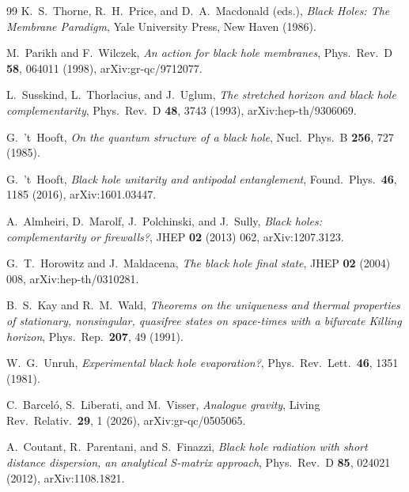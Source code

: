 \documentclass[11pt]{article}
\theoremstyle{definition}
\theoremstyle{remark}
\begin{document}
\begin{thebibliography}{99}
K.~S.~Thorne, R.~H.~Price, and D.~A.~Macdonald (eds.),
\emph{Black Holes: The Membrane Paradigm},
Yale University Press, New Haven (1986).

M.~Parikh and F.~Wilczek,
\emph{An action for black hole membranes},
Phys.\ Rev.\ D \textbf{58}, 064011 (1998), arXiv:gr-qc/9712077.

L.~Susskind, L.~Thorlacius, and J.~Uglum,
\emph{The stretched horizon and black hole complementarity},
Phys.\ Rev.\ D \textbf{48}, 3743 (1993), arXiv:hep-th/9306069.

G.~'t~Hooft,
\emph{On the quantum structure of a black hole},
Nucl.\ Phys.\ B \textbf{256}, 727 (1985).

G.~'t~Hooft,
\emph{Black hole unitarity and antipodal entanglement},
Found.\ Phys.\ \textbf{46}, 1185 (2016), arXiv:1601.03447.

A.~Almheiri, D.~Marolf, J.~Polchinski, and J.~Sully,
\emph{Black holes: complementarity or firewalls?},
JHEP \textbf{02} (2013) 062, arXiv:1207.3123.

G.~T.~Horowitz and J.~Maldacena,
\emph{The black hole final state},
JHEP \textbf{02} (2004) 008, arXiv:hep-th/0310281.

B.~S.~Kay and R.~M.~Wald,
\emph{Theorems on the uniqueness and thermal properties of
stationary, nonsingular, quasifree states on space-times with a
bifurcate Killing horizon},
Phys.\ Rep.\ \textbf{207}, 49 (1991).

W.~G.~Unruh,
\emph{Experimental black hole evaporation?},
Phys.\ Rev.\ Lett.\ \textbf{46}, 1351 (1981).

C.~Barcel\'o, S.~Liberati, and M.~Visser,
\emph{Analogue gravity},
Living Rev.\ Relativ.\ \textbf{29}, 1 (2026), arXiv:gr-qc/0505065.

A.~Coutant, R.~Parentani, and S.~Finazzi,
\emph{Black hole radiation with short distance dispersion, an
analytical S-matrix approach},
Phys.\ Rev.\ D \textbf{85}, 024021 (2012), arXiv:1108.1821.

\end{thebibliography}
\end{document}
